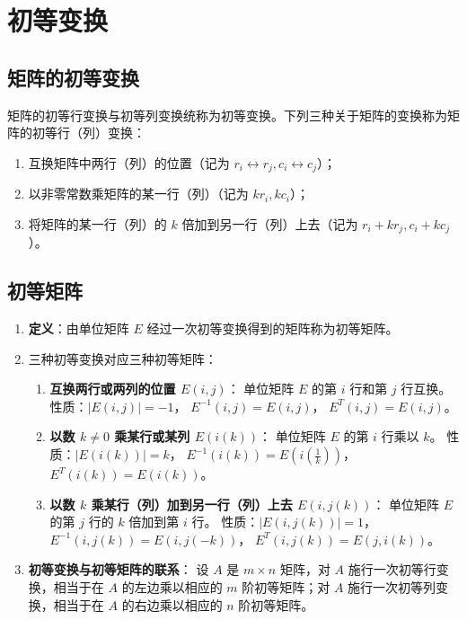 \documentclass[UTF8]{ctexart}
\theoremstyle{mydef}
\begin{document}
\section{初等变换}

\subsection{矩阵的初等变换}
矩阵的初等行变换与初等列变换统称为初等变换。下列三种关于矩阵的变换称为矩阵的初等行（列）变换：
\begin{enumerate}
    \item 互换矩阵中两行（列）的位置（记为 $r_i \leftrightarrow r_j, c_i \leftrightarrow c_j$）；
    \item 以非零常数乘矩阵的某一行（列）（记为 $k r_i, k c_i$）；
    \item 将矩阵的某一行（列）的 $k$ 倍加到另一行（列）上去（记为 $r_i + k r_j, c_i + k c_j$）。
\end{enumerate}

\subsection{初等矩阵}
\begin{enumerate}
    \item \textbf{定义}：由单位矩阵 $E$ 经过一次初等变换得到的矩阵称为初等矩阵。
    \item 三种初等变换对应三种初等矩阵：
    \begin{enumerate}
        \item \textbf{互换两行或两列的位置 $E(i,j)$}：
        单位矩阵 $E$ 的第 $i$ 行和第 $j$ 行互换。
        性质：$|E(i,j)| = -1$， $E^{-1}(i,j) = E(i,j)$， $E^T(i,j) = E(i,j)$。
        \item \textbf{以数 $k \neq 0$ 乘某行或某列 $E(i(k))$}：
        单位矩阵 $E$ 的第 $i$ 行乘以 $k$。
        性质：$|E(i(k))| = k$， $E^{-1}(i(k)) = E(i(\frac{1}{k}))$， $E^T(i(k)) = E(i(k))$。
        \item \textbf{以数 $k$ 乘某行（列）加到另一行（列）上去 $E(i,j(k))$}：
        单位矩阵 $E$ 的第 $j$ 行的 $k$ 倍加到第 $i$ 行。
        性质：$|E(i,j(k))| = 1$， $E^{-1}(i,j(k)) = E(i,j(-k))$， $E^T(i,j(k)) = E(j,i(k))$。
    \end{enumerate}
    \item \textbf{初等变换与初等矩阵的联系}：
    设 $A$ 是 $m \times n$ 矩阵，对 $A$ 施行一次初等行变换，相当于在 $A$ 的左边乘以相应的 $m$ 阶初等矩阵；对 $A$ 施行一次初等列变换，相当于在 $A$ 的右边乘以相应的 $n$ 阶初等矩阵。
\end{enumerate}
\end{document}
